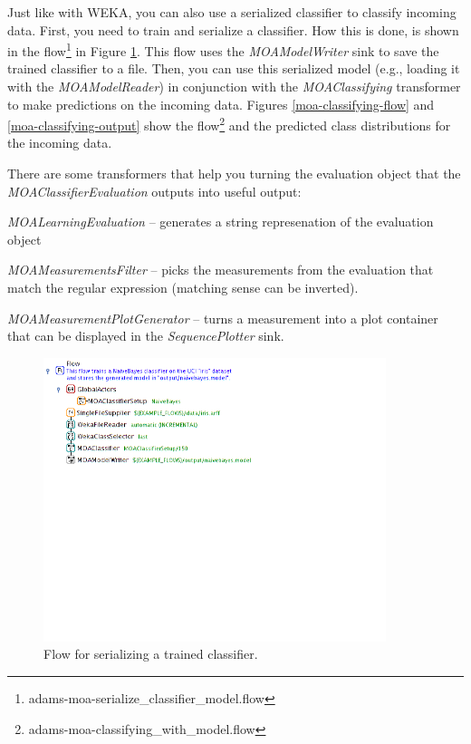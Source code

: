 \documentclass[a4paper]{book}
\begin{document}
\clearpage
Just like with WEKA, you can also use a serialized classifier to classify 
incoming data. First, you need to train and serialize a classifier. How this
is done, is shown in the flow\footnote{adams-moa-serialize\_classifier\_model.flow} 
in Figure \ref{moa-serialize-classifier}.
This flow uses the \textit{MOAModelWriter} sink to save the trained classifier
to a file. Then, you can use this serialized model (e.g., loading it with the 
\textit{MOAModelReader}) in conjunction with the 
\textit{MOAClassifying} transformer to make predictions on the incoming data.
Figures \ref{moa-classifying-flow} and \ref{moa-classifying-output} show the
flow\footnote{adams-moa-classifying\_with\_model.flow} and the predicted
class distributions for the incoming data.

There are some transformers that help you turning the evaluation object that
the \textit{MOAClassifierEvaluation} outputs into useful output:
\begin{tight_itemize}
	\item \textit{MOALearningEvaluation} -- generates a string represenation of
	the evaluation object
	\item \textit{MOAMeasurementsFilter} -- picks the measurements from the
	evaluation that match the regular expression (matching sense can be inverted).
	\item \textit{MOAMeasurementPlotGenerator} -- turns a measurement into a
	plot container that can be displayed in the \textit{SequencePlotter} sink.
\end{tight_itemize}

\begin{figure}[htb]
  \centering
  \includegraphics[width=10.0cm]{images/moa-serialize-classifier.png}
  \caption{Flow for serializing a trained classifier.}
  \label{moa-serialize-classifier}
\end{figure}
\end{document}
